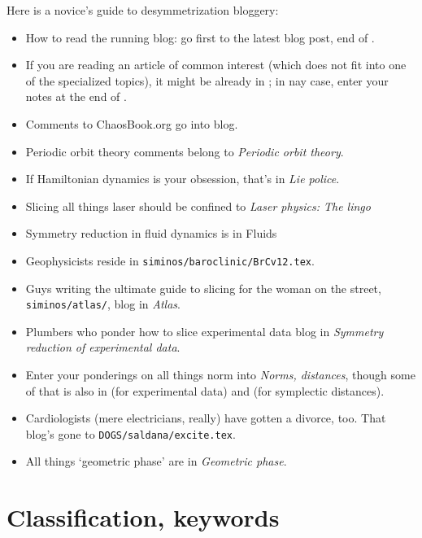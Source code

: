 Here is a novice's guide to desymmetrization bloggery:
\begin{itemize}
  \item
How to read the running blog: go first to the latest blog post, end
of .
  \item
If you are reading an article of common interest (which does not fit into
one of the specialized topics), it might be already in ; 
in nay case, enter your notes at the end of .
  \item
Comments to ChaosBook.org go into  blog.
  \item
Periodic orbit theory comments belong to  {\em
Periodic orbit theory}.
  \item
If Hamiltonian dynamics is your obsession, that's in
 {\em Lie police}.
  \item
Slicing all things laser should be confined to
 {\em Laser physics: The lingo}
  \item
Symmetry reduction in fluid dynamics is in  {Fluids}
  \item
Geophysicists reside in
\texttt{siminos/baroclinic/BrCv12.tex}.
  \item
Guys writing the ultimate guide to slicing for the woman on the street,
\texttt{siminos/atlas/}, blog in  {\em Atlas}.
  \item
Plumbers who ponder how to slice experimental data blog in
 {\em Symmetry reduction of experimental data}.
  \item
Enter your ponderings on all things norm into 
\emph{Norms, distances}, though some of that is also in 
(for experimental data) and  (for symplectic
distances).
  \item
Cardiologists (mere electricians, really) have gotten a divorce, too. That
blog's gone to \texttt{DOGS/saldana/excite.tex}.
  \item
All things `{geometric phase}' are in  {\em
Geometric phase}.

\end{itemize}


\section{Classification, keywords}

